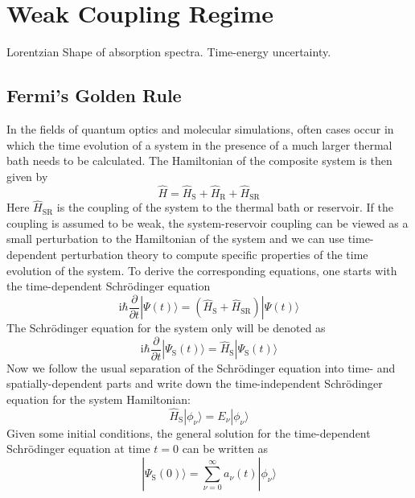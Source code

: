 \documentclass[9pt]{report}
\begin{document}
\section{Weak Coupling Regime}
Lorentzian Shape of absorption spectra. Time-energy uncertainty.

\subsection{Fermi's Golden Rule}
In the fields of quantum optics and molecular simulations, often cases occur in which the time evolution of a system in the presence of a much larger thermal bath needs to be calculated. The Hamiltonian of the composite system is then given by
\begin{equation}
\hat{H}=\hat{H}_{\mathrm{S}}+\hat{H}_{\mathrm{R}}+\hat{H}_{\mathrm{SR}}
\end{equation}
Here $\hat{H}_{\mathrm{SR}}$ is the coupling of the system to the thermal bath or reservoir. If the coupling is assumed to be weak, the system-reservoir coupling can be viewed as a small perturbation to the Hamiltonian of the system and we can use time-dependent perturbation theory to compute specific properties of the time evolution of the system. To derive the corresponding equations, one starts with the time-dependent Schrödinger equation
\begin{equation}
\mathrm{i}\hbar\frac{\partial}{\partial t}|\Psi(t)\rangle = (\hat{H}_{\mathrm{S}}+\hat{H}_{\mathrm{SR}})|\Psi(t)\rangle\label{Total_TDSE}
\end{equation}
The Schrödinger equation for the system only will be denoted as
\begin{equation}
\mathrm{i}\hbar\frac{\partial}{\partial t}|\Psi_{\mathrm{S}}(t)\rangle = \hat{H}_{\mathrm{S}}|\Psi_{\mathrm{S}}(t)\rangle
\end{equation}
Now we follow the usual separation of the Schrödinger equation into time- and spatially-dependent parts and write down the time-independent Schrödinger equation for the system Hamiltonian:
\begin{equation}
\hat{H}_{\mathrm{S}}|\phi_{\nu}\rangle = E_{\nu}|\phi_{\nu}\rangle
\end{equation}
Given some initial conditions, the general solution for the time-dependent Schrödinger equation at time $t=0$ can be written as
\begin{equation}
|\Psi_{\mathrm{S}}(0)\rangle = \sum_{\nu=0}^{\infty}a_{\nu}(t)|\phi_{\nu}\rangle
\end{equation}
\end{document}
